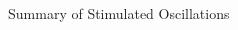 \documentclass[9pt]{beamer}
\begin{document}
\begin{darkframes}
\begin{frame}{Summary of Stimulated Oscillations}
\begin{columns}[T]
\begin{column}{0.4\textwidth}


\end{column}
\end{columns}
\end{frame}
\end{darkframes}
\end{document}
